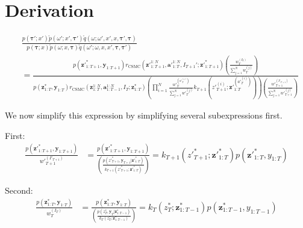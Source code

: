 \documentclass[11pt]{article}
\newcommand{\z}{\mathbf{z}}
\newcommand{\abold}{\mathbf{a}}
\newcommand{\y}{\mathbf{y}}
\newcommand\tdict[0]{\boldsymbol{\tau}}
\begin{document}
\appendix
\section{Derivation}
\begin{align*}
& \frac{p(\tdict'; x') \mathring{p}(\omega'; x', \tdict')\mathring{q}(\omega; \omega', x', x, \tdict', \tdict)}
{p(\tdict; x) \mathring{p}(\omega; x, \tdict) \mathring{q}(\omega'; \omega, x, x', \tdict, \tdict')}\\
&= \frac{
    p({\z'}_{1:T+1}^*, \y_{1:T+1})
    r_{\mathrm{CSMC}}({\z'}_{1:T+1}^{1:N}, {\abold'}_{1:T}^{1:N}, I_{T+1}'; {\z'}_{1:T+1}^*)
    \left( \frac{{w}_{T}^{(I_{T})}}{\sum_{j=1}^N {w}_{T}^{(j)}} \right)
}{
    p(\z_{1:T}^*, \y_{1:T})
    r_{\mathrm{CSMC}}(\z_{1:T}^{1:N}, \abold_{1:T-1}^{1:N}, I_T; \z_{1:T}^*)
    \left( \prod_{i=1}^N \frac{{w'}_{T}^{({a'}_{T}^{(i)})}}{\sum_{j=1}^N {w'}_{T}^{(j)}} k_{T+1}({z'}_{T+1}^{(i)}; {\z'}_{1:T}^{({a'}_{T}^{(i)})} ) \right)
    \left( \frac{{w'}_{T+1}^{(I'_{T+1})}}{\sum_{j=1}^N {w'}_{T+1}^{(j)}} \right)
}
\end{align*}

We now simplify this expression by simplifying several subexpressions first.

First:
\begin{align*}
\frac{p({\z'}_{1:T+1}^*, \y_{1:T+1})}{{w'}_{T+1}^{(I'_{T+1})}}
    &= \frac{p({\z'}_{1:T+1}^*, \y_{1:T+1})}
            {\left(\frac{p({z'}_{T+1}^*, \y_{T+1} | {\z'}_{1:T}^*)}{k_{T+1}({z'}_{T+1}^{*}; {\z'}_{1:T}^{*})}\right)}
    = k_{T+1}({z'}_{T+1}^{*}; {\z'}_{1:T}^{*}) p({\z'}_{1:T}^*, y_{1:T})
\end{align*}

Second:
\begin{align*}
\frac{p({\z}_{1:T}^*, \y_{1:T})}{{w}_{T}^{(I_{T})}}
    &= \frac{p({\z}_{1:T}^*, \y_{1:T})}
            {\left(\frac{p({z}_{T}^*, \y_{T} | {\z}_{1:T-1}^*)}{k_{T}({z}_{T}^{*}; {\z}_{1:T-1}^{*})}\right)}
    = k_{T}({z}_{T}^{*}; {\z}_{1:T-1}^{*}) p({\z}_{1:T-1}^*, y_{1:T-1})
\end{align*}
\end{document}
